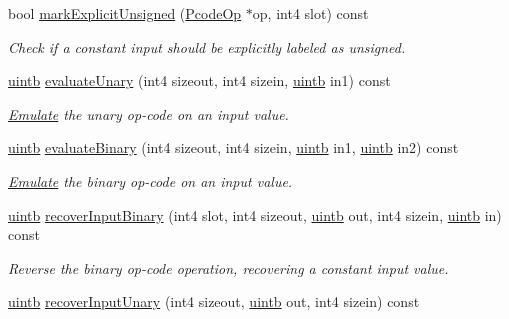 \begin{DoxyCompactItemize}
bool \mbox{\hyperlink{class_type_op_a490abb4596b7ddc78c5afc40a6326701}{mark\+Explicit\+Unsigned}} (\mbox{\hyperlink{class_pcode_op}{Pcode\+Op}} $\ast$op, int4 slot) const
\begin{DoxyCompactList}\small\item\em Check if a constant input should be explicitly labeled as {\itshape unsigned}. \end{DoxyCompactList}\item 
\mbox{\hyperlink{types_8h_a2db313c5d32a12b01d26ac9b3bca178f}{uintb}} \mbox{\hyperlink{class_type_op_a44947ba9af3fb0f2a7b2023d2a3038ca}{evaluate\+Unary}} (int4 sizeout, int4 sizein, \mbox{\hyperlink{types_8h_a2db313c5d32a12b01d26ac9b3bca178f}{uintb}} in1) const
\begin{DoxyCompactList}\small\item\em \mbox{\hyperlink{class_emulate}{Emulate}} the unary op-\/code on an input value. \end{DoxyCompactList}\item 
\mbox{\hyperlink{types_8h_a2db313c5d32a12b01d26ac9b3bca178f}{uintb}} \mbox{\hyperlink{class_type_op_ac5776ded31f8f936853fbb016a93abf8}{evaluate\+Binary}} (int4 sizeout, int4 sizein, \mbox{\hyperlink{types_8h_a2db313c5d32a12b01d26ac9b3bca178f}{uintb}} in1, \mbox{\hyperlink{types_8h_a2db313c5d32a12b01d26ac9b3bca178f}{uintb}} in2) const
\begin{DoxyCompactList}\small\item\em \mbox{\hyperlink{class_emulate}{Emulate}} the binary op-\/code on an input value. \end{DoxyCompactList}\item 
\mbox{\hyperlink{types_8h_a2db313c5d32a12b01d26ac9b3bca178f}{uintb}} \mbox{\hyperlink{class_type_op_a2904d3cce4a93be9e976305779f57474}{recover\+Input\+Binary}} (int4 slot, int4 sizeout, \mbox{\hyperlink{types_8h_a2db313c5d32a12b01d26ac9b3bca178f}{uintb}} out, int4 sizein, \mbox{\hyperlink{types_8h_a2db313c5d32a12b01d26ac9b3bca178f}{uintb}} in) const
\begin{DoxyCompactList}\small\item\em Reverse the binary op-\/code operation, recovering a constant input value. \end{DoxyCompactList}\item 
\mbox{\hyperlink{types_8h_a2db313c5d32a12b01d26ac9b3bca178f}{uintb}} \mbox{\hyperlink{class_type_op_a33410aedda8e08db1eb3d0384e7d5130}{recover\+Input\+Unary}} (int4 sizeout, \mbox{\hyperlink{types_8h_a2db313c5d32a12b01d26ac9b3bca178f}{uintb}} out, int4 sizein) const

\end{DoxyCompactItemize}
